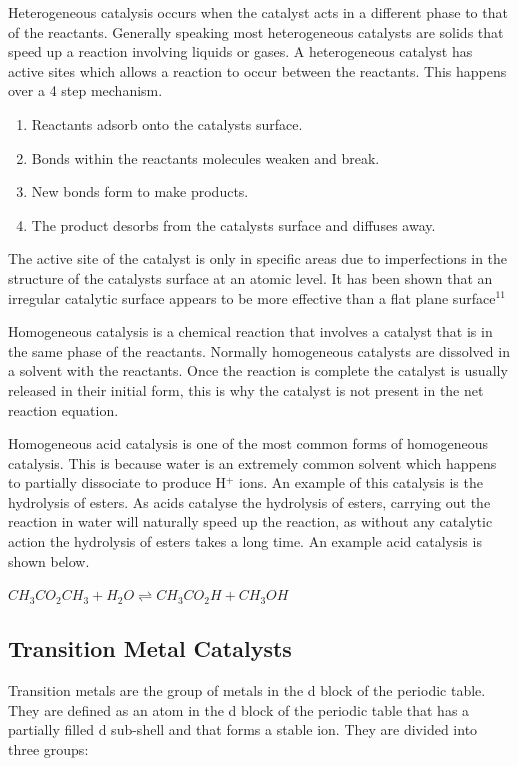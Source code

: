 Heterogeneous catalysis occurs when the catalyst acts in a different phase to that of the reactants. Generally speaking most heterogeneous catalysts are solids that speed up a reaction involving liquids or gases. A heterogeneous catalyst has active sites which allows a reaction to occur between the reactants. This happens over a 4 step mechanism.

\begin{enumerate}
\item Reactants adsorb onto the catalysts surface.
\item Bonds within the reactants molecules weaken and break.
\item New bonds form to make products.
\item The product desorbs from the catalysts surface and diffuses away.
\end{enumerate}

The active site of the catalyst is only in specific areas due to imperfections in the structure of the catalysts surface at an atomic level. It has been shown that an irregular catalytic surface appears to be more effective than a flat plane surface$^{11}$

Homogeneous catalysis is a chemical reaction that involves a catalyst that is in the same phase of the reactants. Normally homogeneous catalysts are dissolved in a solvent with the reactants. Once the reaction is complete the catalyst is usually released in their initial form, this is why the catalyst is not present in the net reaction equation.

Homogeneous acid catalysis is one of the most common forms of homogeneous catalysis. This is because water is an extremely common solvent which happens to partially dissociate to produce H$^+$ ions. An example of this catalysis is the hydrolysis of esters. As acids catalyse the hydrolysis of esters, carrying out the reaction in water will naturally speed up the reaction, as without any catalytic action the hydrolysis of esters takes a long time. An example acid catalysis is shown below.

$CH_3CO_2CH_3 + H_2O \rightleftharpoons CH_3CO_2H + CH_3OH$




	
	\subsection{Transition Metal Catalysts}

Transition metals are the group of metals in the d block of the periodic table. They are defined as an atom in the d block of the periodic table that has a partially filled d sub-shell and that forms a stable ion. They are divided into three groups:

